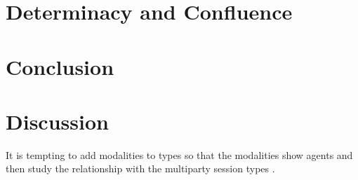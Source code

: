 \section{Determinacy and Confluence}


\section{Conclusion}


\section{Discussion}

It is tempting to add modalities to types so that the
modalities show agents and then study the relationship with the
multiparty session types .